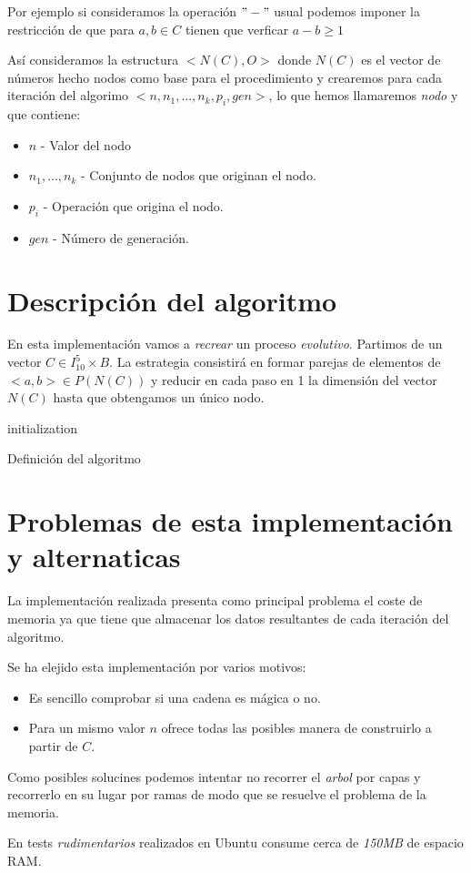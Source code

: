 \documentclass{article}
\begin{document}
Por ejemplo si consideramos la operación $"-"$ usual podemos imponer la
restricción de que para $a,b \in C$ tienen que verficar $a-b \ge 1$

Así consideramos la estructura $<N(C), O>$ donde $N(C)$ es el vector
de números hecho nodos como base para el procedimiento y crearemos
para cada iteración del algorimo
$<n, {n_1, ..., n_k} , p_i, gen>$, lo que hemos llamaremos
\textit{nodo} y que contiene:

\begin{itemize}
\item $n$ - Valor del nodo
\item ${n_1, ..., n_k}$ - Conjunto de nodos que originan el nodo.
\item $p_i$ - Operación que origina el nodo.
\item $gen$ - Número de generación.
\end{itemize}

\section{Descripción del algoritmo}

En esta implementación vamos a \textit{recrear} un proceso
\textit{evolutivo}.  Partimos de un vector
$C \in I_{10}^{5} \times B$. La estrategia consistirá en formar
parejas de elementos de $<a,b> \in P(N(C))$ y reducir en cada paso en
1 la dimensión del vector $N(C)$ hasta que obtengamos un único nodo.

\begin{algorithm}[H]
 initialization\;
 \caption{Definición del algoritmo}
\end{algorithm}

\section{Problemas de esta implementación y alternaticas}

La implementación realizada presenta como principal problema el coste
de memoria ya que tiene que almacenar los datos resultantes de cada
iteración del algoritmo.

Se ha elejido esta implementación por varios motivos:

\begin{itemize}
\item Es sencillo comprobar si una cadena es mágica o no.
\item Para un mismo valor $n$ ofrece todas las posibles manera de
  construirlo a partir de $C$.
\end{itemize}

Como posibles solucines podemos intentar no recorrer el \textit{arbol}
por capas y recorrerlo en su lugar por ramas de modo que se resuelve
el problema de la memoria.

En tests \textit{rudimentarios} realizados en Ubuntu consume cerca de
\textit{150MB} de espacio RAM.
\end{document}

